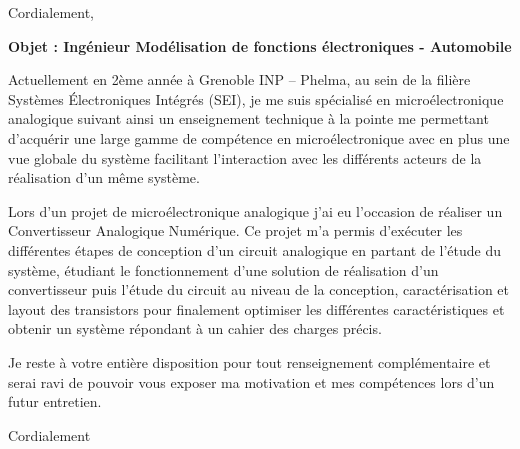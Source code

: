 \documentclass[11pt,a4paper]{moderncv}
\begin{document}

\date{\today} %
\opening{} %
\closing{Cordialement,} %

\makelettertitle %
\justify
\textbf{Objet : Ingénieur Modélisation de fonctions électroniques - Automobile}
\newline{}

Actuellement en 2ème année à Grenoble INP – Phelma, au sein de la filière Systèmes Électroniques Intégrés (SEI), je me suis spécialisé en microélectronique analogique suivant ainsi un enseignement technique à la pointe me permettant d'acquérir une large gamme de compétence en microélectronique avec en plus une vue globale du système facilitant l'interaction avec les différents acteurs de la réalisation d'un même système.\newline{}

Lors d’un projet de microélectronique analogique j’ai eu l’occasion de réaliser un Convertisseur Analogique Numérique. Ce projet m’a permis d’exécuter les différentes étapes de conception d’un circuit analogique en partant de l’étude du système, étudiant le fonctionnement d’une solution de réalisation d’un convertisseur puis l’étude du circuit au niveau de la conception, caractérisation et layout des transistors pour finalement optimiser les différentes caractéristiques et obtenir un système répondant à un cahier des charges précis.\newline{}

Je reste à votre entière disposition pour tout renseignement complémentaire et serai ravi de pouvoir vous exposer ma motivation et mes compétences lors d'un futur entretien.\newline{}

Cordialement



\end{document}
